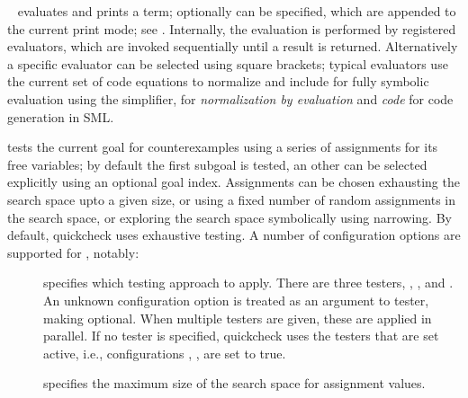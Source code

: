 \begin{isabellebody}
\begin{isamarkuptext}
  \begin{description}

  \item \hyperlink{command.HOL.value}{\mbox{}}~ evaluates and prints a
    term; optionally  can be specified, which are
    appended to the current print mode; see .
    Internally, the evaluation is performed by registered evaluators,
    which are invoked sequentially until a result is returned.
    Alternatively a specific evaluator can be selected using square
    brackets; typical evaluators use the current set of code equations
    to normalize and include  for fully symbolic
    evaluation using the simplifier,  for
    \emph{normalization by evaluation} and \emph{code} for code
    generation in SML.

  \item \hyperlink{command.HOL.quickcheck}{\mbox{}} tests the current goal for
    counterexamples using a series of assignments for its
    free variables; by default the first subgoal is tested, an other
    can be selected explicitly using an optional goal index.
    Assignments can be chosen exhausting the search space upto a given
    size, or using a fixed number of random assignments in the search space,
    or exploring the search space symbolically using narrowing.
    By default, quickcheck uses exhaustive testing.
    A number of configuration options are supported for
    \hyperlink{command.HOL.quickcheck}{\mbox{}}, notably:

    \begin{description}

    \item[] specifies which testing approach to apply.
      There are three testers, ,
      , and .
      An unknown configuration option is treated as an argument to tester,
      making  optional.
      When multiple testers are given, these are applied in parallel. 
      If no tester is specified, quickcheck uses the testers that are
      set active, i.e., configurations
      , ,
       are set to true.
    \item[] specifies the maximum size of the search space
    for assignment values.


\end{description}
\end{description}
\end{isamarkuptext}
\end{isabellebody}
